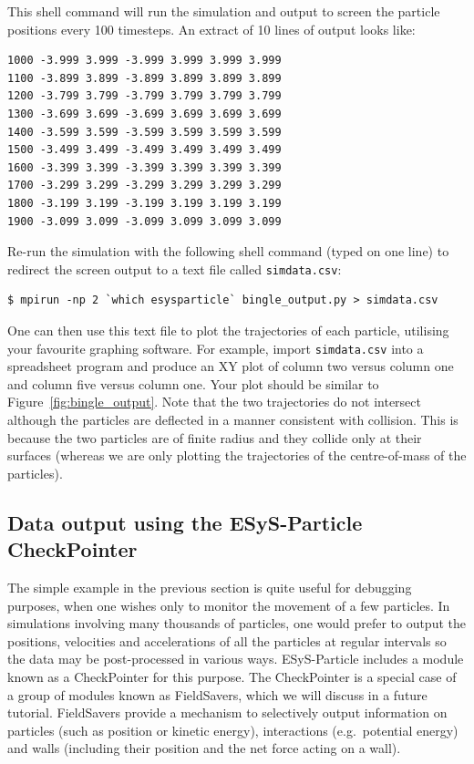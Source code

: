 \noindent
This shell command will run the simulation and output to screen the particle positions every 100 timesteps. An extract of 10 lines of output looks like:

\begin{verbatim}
1000 -3.999 3.999 -3.999 3.999 3.999 3.999
1100 -3.899 3.899 -3.899 3.899 3.899 3.899
1200 -3.799 3.799 -3.799 3.799 3.799 3.799
1300 -3.699 3.699 -3.699 3.699 3.699 3.699
1400 -3.599 3.599 -3.599 3.599 3.599 3.599
1500 -3.499 3.499 -3.499 3.499 3.499 3.499
1600 -3.399 3.399 -3.399 3.399 3.399 3.399
1700 -3.299 3.299 -3.299 3.299 3.299 3.299
1800 -3.199 3.199 -3.199 3.199 3.199 3.199
1900 -3.099 3.099 -3.099 3.099 3.099 3.099
\end{verbatim}

Re-run the simulation with the following shell command (typed on one line) to redirect the screen output to a text file called \texttt{simdata.csv}:

\begin{verbatim}
$ mpirun -np 2 `which esysparticle` bingle_output.py > simdata.csv
\end{verbatim}

\noindent
One can then use this text file to plot the trajectories of each particle, utilising your favourite graphing software. For example, import \texttt{simdata.csv} into a spreadsheet program and produce an XY plot of column two versus column one and column five versus column one. Your plot should be similar to Figure~\ref{fig:bingle_output}. Note that the two trajectories do not intersect although the particles are deflected in a manner consistent with collision. This is because the two particles are of finite radius and they collide only at their surfaces (whereas we are only plotting the trajectories of the centre-of-mass of the particles).

\subsection{Data output using the ESyS-Particle CheckPointer}

The simple example in the previous section is quite useful for debugging purposes, when one wishes only to monitor the movement of a few particles. In simulations involving many thousands of particles, one would prefer to output the positions, velocities and accelerations of all the particles at regular intervals so the data may be post-processed in various ways. ESyS-Particle includes a module known as a CheckPointer for this purpose. The CheckPointer is a special case of a group of modules known as FieldSavers, which we will discuss in a future tutorial. FieldSavers provide a mechanism to selectively output information on particles (such as position or kinetic energy), interactions (e.g.\ potential energy) and walls (including their position and the net force acting on a wall). 

